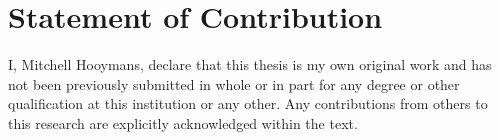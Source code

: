 \chapter*{Statement of Contribution}
\thispagestyle{empty}

I, Mitchell Hooymans, declare that this thesis is my own original work and has not been previously submitted in whole or in part for any degree or other qualification at this institution or any other.  Any contributions from others to this research are explicitly acknowledged within the text.